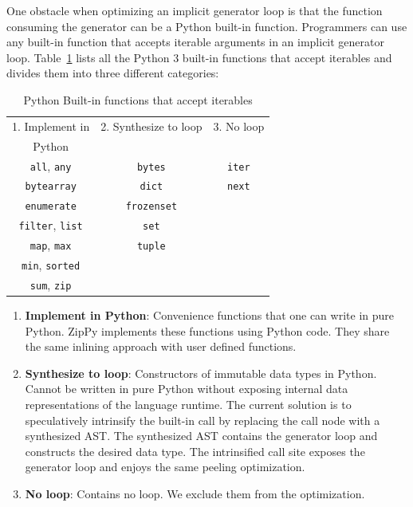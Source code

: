 One obstacle when optimizing an implicit generator loop is that the function consuming the generator can be a Python built-in function.
Programmers can use any built-in function that accepts iterable arguments in an implicit generator loop.
Table~\ref{tab:ch4-builtins} lists all the Python 3 built-in functions that accept iterables and divides them into three different categories:

\begin{table}[!ht]
  \begin{center}
    \begin{tabular}{ c c c }
      \toprule
      1. Implement in                & 2. Synthesize to loop & 3. No loop \\
      Python                         &                       & \\
      \midrule
      \texttt{all}, \texttt{any}     & \texttt{bytes}        & \texttt{iter} \\
      \texttt{bytearray}             & \texttt{dict}         & \texttt{next} \\
      \texttt{enumerate}             & \texttt{frozenset}    &               \\
      \texttt{filter}, \texttt{list} & \texttt{set}          &               \\
      \texttt{map}, \texttt{max}     & \texttt{tuple}        &               \\
      \texttt{min}, \texttt{sorted}  &                       &               \\
      \texttt{sum}, \texttt{zip}     &                       &               \\
      \bottomrule
    \end{tabular}
    \nocaptionrule{}
    \caption{Python Built-in functions that accept iterables}
    \label{tab:ch4-builtins}
  \end{center}
\end{table}

\begin{enumerate}

\item \textbf{Implement in Python}:
Convenience functions that one can write in pure Python.
ZipPy implements these functions using Python code.
They share the same inlining approach with user defined functions.

\item \textbf{Synthesize to loop}:
Constructors of immutable data types in Python.
Cannot be written in pure Python without exposing internal data representations of the language runtime.
The current solution is to speculatively intrinsify the built-in call by replacing the call node with a synthesized AST.
The synthesized AST contains the generator loop and constructs the desired data type.
The intrinsified call site exposes the generator loop and enjoys the same peeling optimization.

\item \textbf{No loop}:
Contains no loop.
We exclude them from the optimization.

\end{enumerate}

